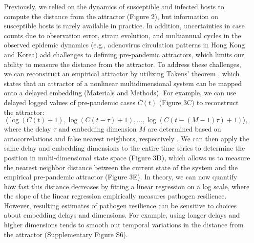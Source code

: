 \documentclass[12pt]{article}
\begin{document}
Previously, we relied on the dynamics of susceptible and infected hosts to compute the distance from the attractor (Figure 2), but information on susceptible hosts is rarely available in practice.
In addition, uncertainties in case counts due to observation error, strain evolution, and multiannual cycles in the observed epidemic dynamics (e.g., adenovirus circulation patterns in Hong Kong and Korea) add challenges to defining pre-pandemic attractors, which limits our ability to measure the distance from the attractor.
To address these challenges, we can reconstruct an empirical attractor by utilizing Takens' theorem \citep{takens2006detecting}, which states that an attractor of a nonlinear multidimensional system can be mapped onto a delayed embedding (Materials and Methods).
For example, we can use delayed logged values of pre-pandemic cases $C(t)$ (Figure 3C) to reconstruct the attractor:
\begin{equation}
\langle\log(C(t)+1), \log(C(t-\tau)+1), \dots, \log(C(t-(M-1)\tau)+1)\rangle,
\end{equation}
where the delay $\tau$ and embedding dimension $M$ are determined based on autocorrelations and false nearest neighbors, respectively \citep{kennel1992determining,tan2023selecting}.
We can then apply the same delay and embedding dimensions to the entire time series to determine the position in multi-dimensional state space (Figure 3D), which allows us to measure the nearest neighbor distance between the current state of the system and the empirical pre-pandemic attractor (Figure 3E).
In theory, we can now quantify how fast this distance decreases by fitting a linear regression on a log scale, where the slope of the linear regression empirically measures pathogen resilience.
However, resulting estimates of pathogen resilience can be sensitive to choices about embedding delays and dimensions.
For example, using longer delays and higher dimensions tends to smooth out temporal variations in the distance from the attractor (Supplementary Figure S6).
\end{document}
